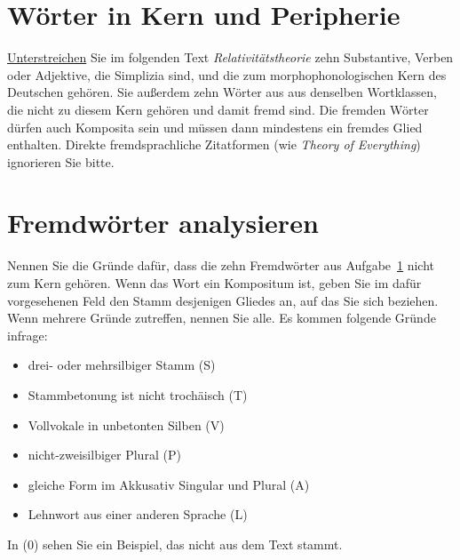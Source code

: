 \section{Wörter in Kern und Peripherie}\label{sec:woerter}

\ul{Unterstreichen} Sie im folgenden Text \textit{Relativitätstheorie} zehn Substantive, Verben oder Adjektive, die Simplizia sind, und die zum morphophonologischen Kern des Deutschen gehören.
 Sie außerdem zehn Wörter aus aus denselben Wortklassen, die nicht zu diesem Kern gehören und damit fremd sind.
Die fremden Wörter dürfen auch Komposita sein und müssen dann mindestens ein fremdes Glied enthalten.
Direkte fremdsprachliche Zitatformen (wie \textit{Theory of Everything}) ignorieren Sie bitte.

\section{Fremdwörter analysieren}\label{sec:analyse}

Nennen Sie die Gründe dafür, dass die zehn Fremdwörter aus Aufgabe~\ref{sec:woerter} nicht zum Kern gehören.
Wenn das Wort ein Kompositum ist, geben Sie im dafür vorgesehenen Feld den Stamm desjenigen Gliedes an, auf das Sie sich beziehen.
Wenn mehrere Gründe zutreffen, nennen Sie alle.
Es kommen folgende Gründe infrage:

\begin{itemize}\Lf
  \item drei- oder mehrsilbiger Stamm (S)
  \item Stammbetonung ist nicht trochäisch (T)
  \item Vollvokale in unbetonten Silben (V)
  \item nicht-zweisilbiger Plural (P)
  \item gleiche Form im Akkusativ Singular und Plural (A)
  \item Lehnwort aus einer anderen Sprache (L)
\end{itemize}

In (0) sehen Sie ein Beispiel, das nicht aus dem Text stammt.


